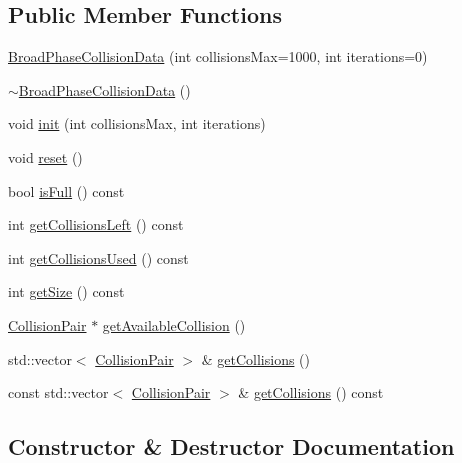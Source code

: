 \subsection*{Public Member Functions}
\begin{DoxyCompactItemize}
\item 
\mbox{\hyperlink{classr3_1_1_broad_phase_collision_data_a435ccad13c2e1d67f1550e11faf7fa3f}{Broad\+Phase\+Collision\+Data}} (int collisions\+Max=1000, int iterations=0)
\item 
\mbox{\hyperlink{classr3_1_1_broad_phase_collision_data_a54a7831ccec5886c70192159bdd62b0c}{$\sim$\+Broad\+Phase\+Collision\+Data}} ()
\item 
void \mbox{\hyperlink{classr3_1_1_broad_phase_collision_data_a6501b0c4ab0f881b6476332aff03d06b}{init}} (int collisions\+Max, int iterations)
\item 
void \mbox{\hyperlink{classr3_1_1_broad_phase_collision_data_a258a014684e0c480929e8980a40a5ab9}{reset}} ()
\item 
bool \mbox{\hyperlink{classr3_1_1_broad_phase_collision_data_a2a553a4971808f372fc4511bdcd8797c}{is\+Full}} () const
\item 
int \mbox{\hyperlink{classr3_1_1_broad_phase_collision_data_a3b063cc09bfac0a6a87fb03dccef16a9}{get\+Collisions\+Left}} () const
\item 
int \mbox{\hyperlink{classr3_1_1_broad_phase_collision_data_acdcf9e658532adf83d51f6cb01d82a16}{get\+Collisions\+Used}} () const
\item 
int \mbox{\hyperlink{classr3_1_1_broad_phase_collision_data_a6ec1a2db157093ffa0fb790dbf82907e}{get\+Size}} () const
\item 
\mbox{\hyperlink{classr3_1_1_collision_pair}{Collision\+Pair}} $\ast$ \mbox{\hyperlink{classr3_1_1_broad_phase_collision_data_a896087f6429507bdd382425c6ffd8ca6}{get\+Available\+Collision}} ()
\item 
std\+::vector$<$ \mbox{\hyperlink{classr3_1_1_collision_pair}{Collision\+Pair}} $>$ \& \mbox{\hyperlink{classr3_1_1_broad_phase_collision_data_a980b5929f5717557bf2b145478a25e86}{get\+Collisions}} ()
\item 
const std\+::vector$<$ \mbox{\hyperlink{classr3_1_1_collision_pair}{Collision\+Pair}} $>$ \& \mbox{\hyperlink{classr3_1_1_broad_phase_collision_data_a2096507a5422a1fb3ba213a2638f9143}{get\+Collisions}} () const
\end{DoxyCompactItemize}


\subsection{Constructor \& Destructor Documentation}
\mbox{\label{classr3_1_1_broad_phase_collision_data_a435ccad13c2e1d67f1550e11faf7fa3f}} 
